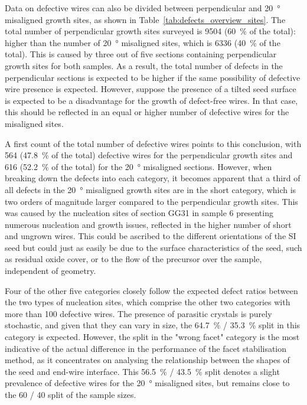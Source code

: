 Data on defective wires can also be divided between perpendicular and \qty{20}{\degree} misaligned growth sites, as shown in Table~\ref{tab:defects_overview_sites}. The total number of perpendicular growth sites surveyed is \num{9504} (\qty{60}{\%} of the total): higher than the number of \qty{20}{\degree} misaligned sites, which is \num{6336} (\qty{40}{\%} of the total). This is caused by three out of five sections containing perpendicular growth sites for both samples. As a result, the total number of defects in the perpendicular sections is expected to be higher if the same possibility of defective wire presence is expected. However, suppose the presence of a tilted seed surface is expected to be a disadvantage for the growth of defect-free wires. In that case, this should be reflected in an equal or higher number of defective wires for the misaligned sites.

A first count of the total number of defective wires points to this conclusion, with \num{564} (\qty{47.8}{\%} of the total) defective wires for the perpendicular growth sites and \num{616} (\qty{52.2}{\%} of the total) for the \qty{20}{\degree} misaligned sections. However, when breaking down the defects into each category, it becomes apparent that a third of all defects in the \qty{20}{\degree} misaligned growth sites are in the short category, which is two orders of magnitude larger compared to the perpendicular growth sites. This was caused by the nucleation sites of section GG31 in sample 6 presenting numerous nucleation and growth issues, reflected in the higher number of short and ungrown wires. This could be ascribed to the different orientations of the \acl{SI} seed but could just as easily be due to the surface characteristics of the seed, such as residual oxide cover, or to the flow of the precursor over the sample, independent of geometry.

Four of the other five categories closely follow the expected defect ratios between the two types of nucleation sites, which comprise the other two categories with more than \num{100} defective wires. The presence of parasitic crystals is purely stochastic, and given that they can vary in size, the \qty{64.7}{\%} / \qty{35.3}{\%} split in this category is expected. However, the split in the "wrong facet" category is the most indicative of the actual difference in the performance of the facet stabilisation method, as it concentrates on analysing the relationship between the shapes of the seed and end-wire interface. This \qty{56.5}{\%} / \qty{43.5}{\%} split denotes a slight prevalence of defective wires for the \qty{20}{\degree} misaligned sites, but remains close to the \num{60} / \num{40} split of the sample sizes.

